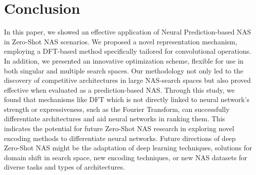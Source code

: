 \documentclass[lettersize,journal]{IEEEtran}
\begin{document}
\section{Conclusion} \label{sec:conclusion}
    In this paper, we showed an effective application of Neural Prediction-based NAS in Zero-Shot NAS scenarios. We proposed a novel representation mechanism, employing a DFT-based method specifically tailored for convolutional operations. In addition, we presented an innovative optimization scheme, flexible for use in both singular and multiple search spaces. Our methodology not only led to the discovery of competitive architectures in large NAS-search spaces but also proved effective when evaluated as a prediction-based NAS. Through this study, we found that mechanisms like DFT which is not directly linked to neural network's strength or expressiveness, such as the Fourier Transform, can successfully differentiate architectures and aid neural networks in ranking them. This indicates the potential for future Zero-Shot NAS research in exploring novel encoding methods to differentiate neural networks. Future directions of deep Zero-Shot NAS might be the adaptation of deep learning techniques, solutions for domain shift in search space, new encoding techniques, or new NAS datasets for diverse tasks and types of architectures.
    






























\appendices











\ifCLASSOPTIONcaptionsoff
  \newpage
\fi


\end{document}
